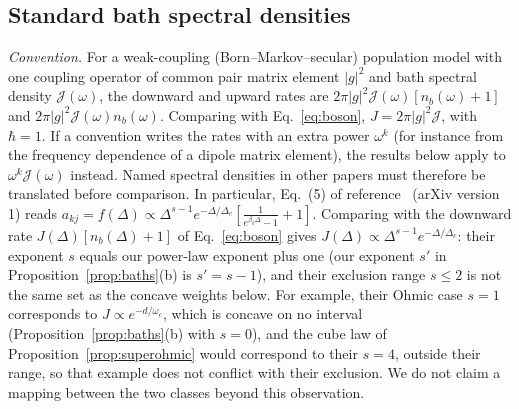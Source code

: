 \documentclass[11pt,a4paper]{article}
\theoremstyle{remark}\newtheorem{remark}[theorem]{Remark}
\begin{document}
\subsection{Standard bath spectral densities}\label{sec:baths}
\emph{Convention.} For a weak-coupling (Born--Markov--secular) population model with one coupling operator of common pair matrix element $|g|^2$ and bath spectral density $\mathcal J(\omega)$, the downward and upward rates are $2\pi|g|^2\mathcal J(\omega)[n_b(\omega)+1]$ and $2\pi|g|^2\mathcal J(\omega)n_b(\omega)$. Comparing with Eq.~\eqref{eq:boson}, $J=2\pi|g|^2\mathcal J$, with $\hbar=1$. If a convention writes the rates with an extra power $\omega^k$ (for instance from the frequency dependence of a dipole matrix element), the results below apply to $\omega^k\mathcal J(\omega)$ instead. Named spectral densities in other papers must therefore be translated before comparison. In particular, Eq.~(5) of reference~\cite{Avitan2026} (arXiv version 1) reads $a_{kj}=f(\Delta)\propto\Delta^{s-1}e^{-\Delta/\Delta_c}\left[\frac{1}{e^{\beta_b\Delta}-1}+1\right]$. Comparing with the downward rate $J(\Delta)[n_b(\Delta)+1]$ of Eq.~\eqref{eq:boson} gives $J(\Delta)\propto\Delta^{s-1}e^{-\Delta/\Delta_c}$: their exponent $s$ equals our power-law exponent plus one (our exponent $s'$ in Proposition~\ref{prop:baths}(b) is $s'=s-1$), and their exclusion range $s\le2$ is not the same set as the concave weights below. For example, their Ohmic case $s=1$ corresponds to $J\propto e^{-d/\omega_c}$, which is concave on no interval (Proposition~\ref{prop:baths}(b) with $s=0$), and the cube law of Proposition~\ref{prop:superohmic} would correspond to their $s=4$, outside their range, so that example does not conflict with their exclusion. We do not claim a mapping between the two classes beyond this observation.
\end{document}
